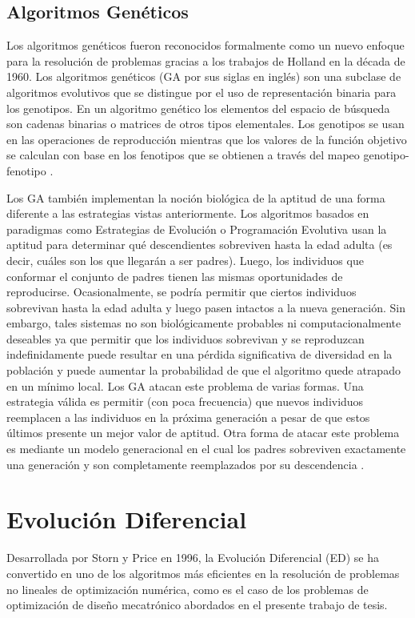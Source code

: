 \subsection{Algoritmos Genéticos}
Los algoritmos genéticos fueron reconocidos formalmente como un nuevo  enfoque para la resolución de problemas gracias a los trabajos de Holland \cite{holland1962outline} \cite{holland1969adaptive} \cite{holland1992adaptation} en la década de 1960. 
Los algoritmos genéticos (GA por sus siglas en inglés) son una subclase de algoritmos evolutivos que se distingue por el uso de representación binaria para los genotipos. En un algoritmo genético los elementos del espacio de búsqueda son cadenas binarias o matrices de otros tipos elementales. Los genotipos se usan en las operaciones de reproducción mientras que los valores de la función objetivo se calculan con base en los fenotipos que se obtienen a través del mapeo genotipo-fenotipo \cite{weise2009global}.

Los GA también implementan la noción biológica de la aptitud de una forma diferente a las estrategias vistas anteriormente. Los algoritmos basados en paradigmas como Estrategias de Evolución o Programación Evolutiva usan la aptitud para determinar qué descendientes sobreviven hasta la edad adulta (es decir, cuáles son los que llegarán a ser padres). Luego, los individuos que conformar el conjunto de padres tienen las mismas oportunidades de reproducirse. Ocasionalmente, se podría permitir que ciertos individuos sobrevivan hasta la edad adulta y luego pasen intactos a la nueva generación. Sin embargo, tales sistemas no son biológicamente probables ni computacionalmente deseables ya que permitir que los individuos sobrevivan y se reproduzcan indefinidamente puede resultar en una pérdida significativa de diversidad en la población y puede aumentar la probabilidad de que el algoritmo quede atrapado en un mínimo local. Los GA atacan este problema de varias formas. Una estrategia válida es  permitir (con poca frecuencia) que nuevos individuos reemplacen a las individuos en la próxima generación a pesar de que estos últimos presente un mejor valor de aptitud. Otra forma de atacar este problema es mediante un modelo generacional en el cual los padres sobreviven exactamente una generación y son completamente reemplazados por su descendencia \cite{de2006evolutionary}.
\section{Evolución Diferencial}
Desarrollada por Storn y Price en 1996, la Evolución Diferencial (ED) se ha convertido en uno de los algoritmos más eficientes en la resolución de problemas no lineales de optimización numérica, como es el caso de los problemas de optimización de diseño mecatrónico abordados en el presente trabajo de tesis.

